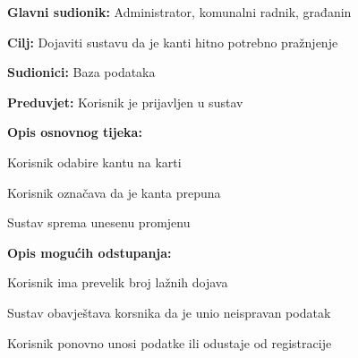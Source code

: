 				
				
				
					\noindent {}
					\begin{packed_item}
	
						\item \textbf{Glavni sudionik: }Administrator, komunalni radnik, građanin
						\item  \textbf{Cilj:} Dojaviti sustavu da je kanti hitno potrebno pražnjenje
						\item  \textbf{Sudionici:} Baza podataka
						\item  \textbf{Preduvjet:} Korisnik je prijavljen u sustav
						\item  \textbf{Opis osnovnog tijeka:}
						
						\item[] \begin{packed_enum}
	
							\item Korisnik odabire kantu na karti
							\item Korisnik označava da je kanta prepuna
							\item Sustav sprema unesenu promjenu
							
						\end{packed_enum}
						
						\item  \textbf{Opis mogućih odstupanja:}
						
						\item[] \begin{packed_item}
	
							\item[2.a] Korisnik ima prevelik broj lažnih dojava
							
							\item[] \begin{packed_enum}
								
								\item Sustav obavještava korsnika da je unio neispravan podatak
								\item Korisnik ponovno unosi podatke ili odustaje od registracije
								
							
							\end{packed_enum}
							
						\end{packed_item}
					\end{packed_item}

				
				
